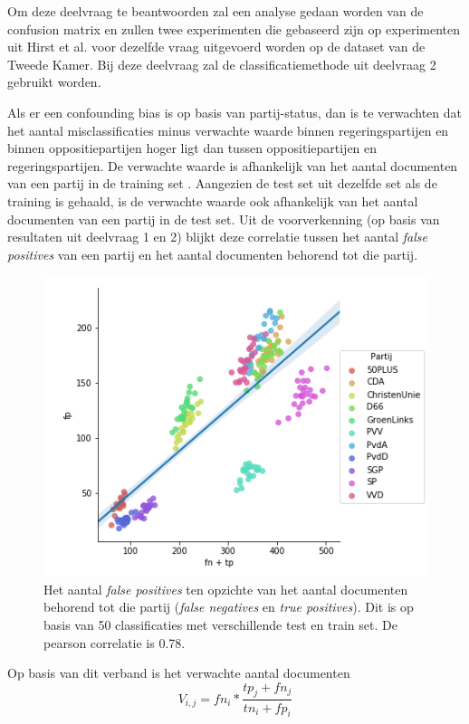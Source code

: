 Om deze deelvraag te beantwoorden zal een analyse gedaan worden van de confusion matrix en zullen twee experimenten die gebaseerd zijn op experimenten uit Hirst et al. voor dezelfde vraag uitgevoerd worden op de dataset van de Tweede Kamer. Bij deze deelvraag zal de classificatiemethode uit deelvraag 2 gebruikt worden.\par
Als er een confounding bias is op basis van partij-status, dan is te verwachten dat het aantal misclassificaties minus verwachte waarde binnen regeringspartijen en binnen oppositiepartijen hoger ligt dan tussen oppositiepartijen en regeringspartijen. De verwachte waarde is afhankelijk van het aantal documenten van een partij in de training set \cite{Sahare}. Aangezien de test set uit dezelfde set als de training is gehaald, is de verwachte waarde ook afhankelijk van het aantal documenten van een partij in de test set. Uit de voorverkenning (op basis van resultaten uit deelvraag 1 en 2) blijkt deze correlatie tussen het aantal \textit{false positives} van een partij en het aantal documenten behorend tot die partij.
\begin{figure}[H]
  \centering
    \includegraphics[width=0.60\paperwidth]{Verslag/Tables/Correlation.png}
\caption{Het aantal \textit{false positives} ten opzichte van het aantal documenten behorend tot die partij (\textit{false negatives} en \textit{true positives}). Dit is op basis van 50 classificaties met verschillende test en train set. De pearson correlatie is 0.78.}
\label{fig:correlation}
\end{figure}
Op basis van dit verband is het verwachte aantal documenten
\begin{equation}
V_{i,j}  = fn_i *  \frac{tp_{j}+fn_{j}}{tn_{i}+fp_{i}}
\end{equation}
